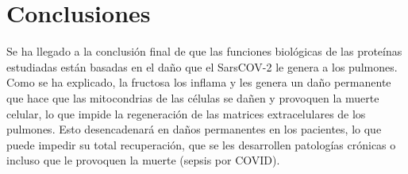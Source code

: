 \section{Conclusiones}

Se ha llegado a la conclusión final de que las funciones biológicas de las proteínas estudiadas están basadas en el daño que el SarsCOV-2 le genera a los pulmones. 
Como se ha explicado, la fructosa los inflama y les genera un daño permanente que hace que las mitocondrias de las células se dañen y provoquen la muerte celular, lo que impide la regeneración de las matrices extracelulares de los pulmones.
Esto desencadenará en daños permanentes en los pacientes, lo que puede impedir su total recuperación, que se les desarrollen patologías crónicas o incluso que le provoquen la muerte (sepsis por COVID).